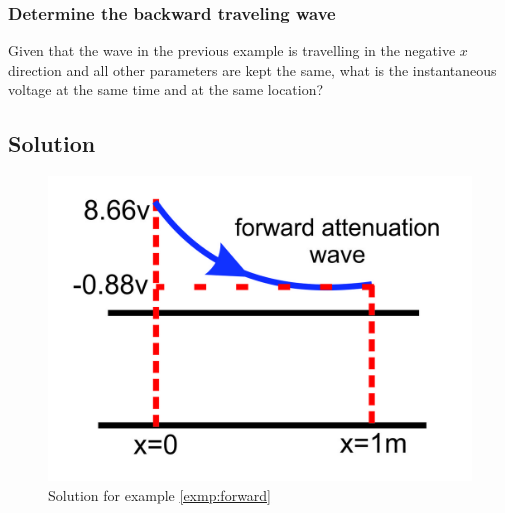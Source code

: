 \begin{exmp}
\subsubsection*{Determine the backward traveling wave}
Given that the wave in the previous example is travelling in the negative ${x}$ direction and all other parameters are kept the same, what is the instantaneous voltage at the same time and at the same location?

\subsection*{Solution}
\begin{figure}[h]
\centering
\includegraphics[scale=0.5]{./graphics/Group98}
\caption{Solution for example \ref{exmp:forward}}
\label{fig:group98}
\end{figure}


\end{exmp}
